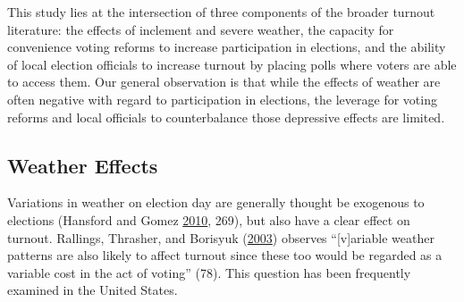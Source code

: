 \documentclass[
  12pt,
]{article}
\begin{document}
This study lies at the intersection of three components of the broader turnout literature: the effects of inclement and severe weather, the capacity for convenience voting reforms to increase participation in elections, and the ability of local election officials to increase turnout by placing polls where voters are able to access them. Our general observation is that while the effects of weather are often negative with regard to participation in elections, the leverage for voting reforms and local officials to counterbalance those depressive effects are limited.

\hypertarget{weather-effects}{%
\subsection*{Weather Effects}\label{weather-effects}}

Variations in weather on election day are generally thought be exogenous to elections (Hansford and Gomez \protect\hyperlink{ref-Hansford2010}{2010}, 269), but also have a clear effect on turnout. Rallings, Thrasher, and Borisyuk (\protect\hyperlink{ref-Rallings2003}{2003}) observes ``{[}v{]}ariable weather patterns are also likely to affect turnout since these too would be regarded as a variable cost in the act of voting'' (78). This question has been frequently examined in the United States.
\end{document}
